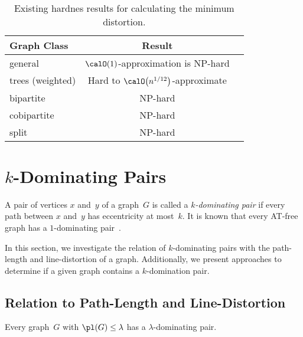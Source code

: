 \begin{table}
    [htb]
    \centering
    \caption
    {%
        Existing hardnes results for calculating the minimum distortion.
    }
    \label{tbl:ExisHardLineDesResults}
%
    \def\arraystretch{1.25}
    \begin{tabular}{lcc}
        \hline
        Graph Class
            & Result
            & \\
        \hline
        general
            & $\calO(1)$-approximation is NP-hard
            & \cite{BadDhaGupRab2005} \\
        trees (weighted)
            & Hard to $\calO \! \left( n^{1/12} \right)$-approximate
            & \cite{BadChuIndSid2005} \\
        bipartite
            & NP-hard
            & \cite{HeggerMeiste2010} \\
        cobipartite
            & NP-hard
            & \cite{HeggerMeiste2010} \\
        split
            & NP-hard
            & \cite{HeggerMeiste2010} \\
        \hline
    \end{tabular}
\end{table}


\section{$k$-Dominating Pairs}
    \label{sec:met-prop}

A pair of vertices $x$ and~$y$ of a graph~$G$ is called a \emph{\( k \)-dominating pair} if every path between $x$ and~$y$ has eccentricity at most~$k$.
It is known that every AT-free graph has a $1$-dominating pair~\cite{CornOlarStew1997}.

In this section, we investigate the relation of $k$-dominating pairs with the path-length and line-distortion of a graph.
Additionally, we present approaches to determine if a given graph contains a $k$-domination pair.

\subsection{Relation to Path-Length and Line-Distortion}

\begin{lemma}
    \label{lem:plDomPairRelation}
Every graph~\( G \) with \( \pl(G) \leq \lambda \) has a \( \lambda \)-dominating pair.
\end{lemma}

